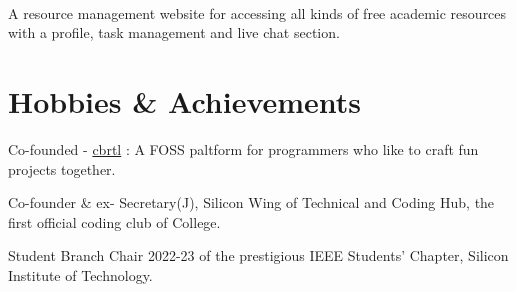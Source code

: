 \documentclass[]{assets/deedy-resume-openfont}
\begin{document}
\hfill {}\\
A resource management website for accessing all kinds of free academic resources with a profile, task management and live chat section.\\

\sectionsep
%
%
\section{Hobbies \& Achievements}
\begin{tightemize}  
\item Co-founded - \href{https://cbrtl.github.io}{cbrtl} : A FOSS paltform for programmers who like to craft fun projects together.\\
\item Co-founder \& ex- Secretary(J), Silicon Wing of Technical and Coding Hub, the first official coding club of College.\\
\item Student Branch Chair 2022-23 of the prestigious IEEE Students’ Chapter, Silicon Institute of Technology.\\
\end{tightemize}
\ 
\end{document}
